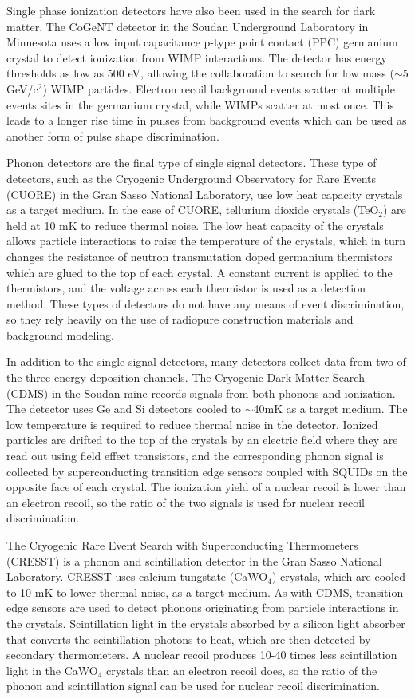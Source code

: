 \documentclass[a4paper,12pt]{article}
\begin{document}
Single phase ionization detectors have also been used in the search for dark matter.  The CoGeNT detector in the Soudan Underground Laboratory in Minnesota uses a low input capacitance p-type point contact (PPC) germanium crystal to detect ionization from WIMP interactions.  The detector has energy thresholds as low as 500 eV, allowing the collaboration to search for low mass ($\sim$5 GeV/c$^2$) WIMP particles.  Electron recoil background events scatter at multiple events sites in the germanium crystal, while WIMPs scatter at most once. This leads to a longer rise time in pulses from background events which can be used as another form of pulse shape discrimination.

Phonon detectors are the final type of single signal detectors.  These type of detectors, such as the Cryogenic Underground Observatory for Rare Events (CUORE) in the Gran Sasso National Laboratory, use low heat capacity crystals as a target medium. In the case of CUORE, tellurium dioxide crystals (TeO$_2$) are held at 10 mK to reduce thermal noise.  The low heat capacity of the crystals allows particle interactions to raise the temperature of the crystals, which in turn changes the resistance of neutron transmutation doped germanium thermistors which are glued to the top of each crystal.  A constant current is applied to the thermistors, and the voltage across each thermistor is used as a detection method.  These types of detectors do not have any means of event discrimination, so they rely heavily on the use of radiopure construction materials and background modeling.

In addition to the single signal detectors, many detectors collect data from two of the three energy deposition channels.  The Cryogenic Dark Matter Search (CDMS)  in the Soudan mine records signals from both phonons and ionization.  The detector uses Ge and Si detectors cooled to $\sim$40mK as a target medium.  The low temperature is required to reduce thermal noise in the detector.  Ionized particles are drifted to the top of the crystals by an electric field where they are read out using field effect transistors, and the corresponding phonon signal is collected by superconducting transition edge sensors coupled with SQUIDs on the opposite face of each crystal.  The ionization yield of a nuclear recoil is lower than an electron recoil, so the ratio of the two signals is used for nuclear recoil discrimination.

The Cryogenic Rare Event Search with Superconducting Thermometers (CRESST) is a phonon and scintillation detector in the Gran Sasso National Laboratory.  CRESST uses calcium tungstate (CaWO$_4$) crystals, which are cooled to 10 mK to lower thermal noise, as a target medium. As with CDMS, transition edge sensors are used to detect phonons originating from particle interactions in the crystals.  Scintillation light in the crystals absorbed by a silicon light absorber that converts the scintillation photons to heat, which are then detected by secondary thermometers.  A nuclear recoil produces 10-40 times less scintillation light in the CaWO$_4$ crystals than an electron recoil does, so the ratio of the phonon and scintillation signal can be used for nuclear recoil discrimination.
\end{document}
